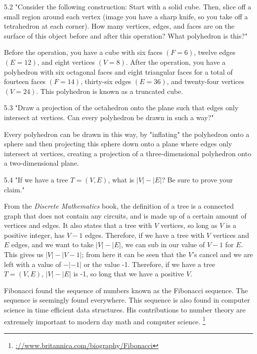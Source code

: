 \documentclass{article}
\begin{document}
5.2 "Consider the following construction: Start with a solid cube. Then, slice off a small region around each vertex (image you have a sharp knife, so you take off a tetrahedron at each corner). How many vertices, edges, and faces are on the surface of this object before and after this operation? What polyhedron is this?"

Before the operation, you have a cube with six faces $(F = 6)$, twelve edges $(E = 12)$, and eight vertices $(V = 8)$. After the operation, you have a polyhedron with six octagonal faces and eight triangular faces for a total of fourteen faces $(F = 14)$, thirty-six edges $(E = 36)$, and twenty-four vertices $(V = 24)$. This polyhedron is known as a truncated cube. 

5.3 "Draw a projection of the octahedron onto the plane such that edges only intersect at vertices. Can every polyhedron be drawn in such a way?"

Every polyhedron can be drawn in this way, by "inflating" the polyhedron onto a sphere and then projecting this sphere down onto a plane where edges only intersect at vertices, creating a projection of a three-dimensional polyhedron onto a two-dimensional plane.

5.4 "If we have a tree $T=(V,E)$, what is $|V|-|E|$? Be sure to prove your claim."

From the \textit{Discrete Mathematics} book, the definition of a tree is a connected graph that does not contain any circuits, and is made up of a certain amount of vertices and edges. It also states that a tree with $V$ vertices, so long as $V$ is a positive integer, has $V - 1$ edges. Therefore, if we have a tree with $V$ vertices and $E$ edges, and we want to take $|V|-|E|$, we can sub in our value of $V - 1$ for $E$. This gives us $|V|-|V - 1|$; from here it can be seen that the $V$'s cancel and we are left with a value of $-|-1|$ or the value -1. Therefore, if we have a tree $T=(V,E)$, $|V|-|E|$ is -1, so long that we have a positive $V$.

\clearpage
\header

Fibonacci found the sequence of numbers known as the Fibonacci sequence. The sequence is seemingly found everywhere. This sequence is also found in computer science in time efficient data structures. His contributions to number theory are extremely important to modern day math and computer science.
\footnote{\hyperref[Resource 1]{\ulhttps://www.britannica.com/biography/Fibonacci}}
\end{document}
